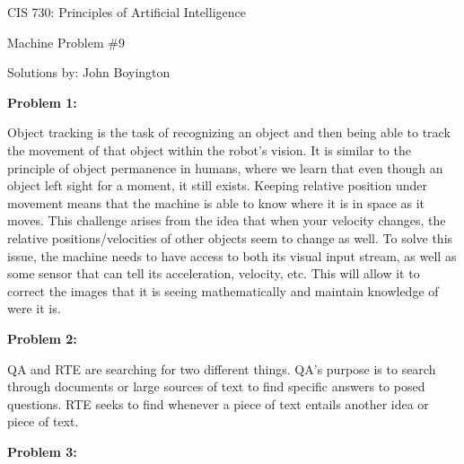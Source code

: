 \documentclass{amsart}
\theoremstyle{definition}
\begin{document}
\LARGE{CIS 730: Principles of Artificial Intelligence}
 
\large
Machine Problem \#9
 
Solutions by: John Boyington
\newline
\bigskip



\textbf{Problem 1:}
\bigbreak

Object tracking is the task of recognizing an object and then being able to track the movement of that object within the robot's vision.
It is similar to the principle of object permanence in humans, where we learn that even though an object left sight for a moment, it still exists.
Keeping relative position under movement means that the machine is able to know where it is in space as it moves.
This challenge arises from the idea that when your velocity changes, the relative positions/velocities of other objects seem to change as well.
To solve this issue, the machine needs to have access to both its visual input stream, as well as some sensor that can tell its acceleration, velocity, etc.
This will allow it to correct the images that it is seeing mathematically and maintain knowledge of were it is.


\bigbreak
\textbf{Problem 2:}
\bigbreak

QA and RTE are searching for two different things.
QA's purpose is to search through documents or large sources of text to find specific answers to posed questions.
RTE seeks to find whenever a piece of text entails another idea or piece of text.



\bigbreak
\textbf{Problem 3:}
\bigbreak
\end{document}
